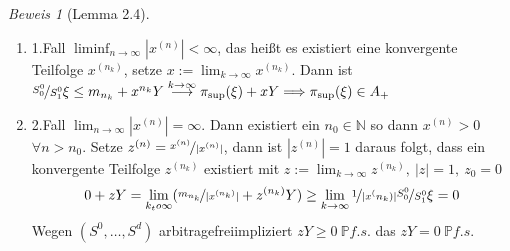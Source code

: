 \documentclass[]{scrartcl}
\numberwithin{equation}{section}
\theoremstyle{plain}
\theoremstyle{definition}
\theoremstyle{remark}
\theoremstyle{proof}
\newtheorem*{bew}{Beweis}
\newcommand{\N}{\mathbb{N}}
\renewcommand{\P}{\mathbb{P}}
\newcommand{\Ss}{\nicefrac{S_0^0}{S_1^0}}
\newcommand{\af}{arbitragefrei}
\begin{document}
\begin{bew}[Lemma 2.4]
\begin{enumerate}
 	 		\begin{enumerate}
 	 			\item 1.Fall $\operatorname{liminf}_{n\to\infty}|x^{(n)}|<\infty$, das heißt es existiert eine konvergente Teilfolge $x^{(n_k)}$, setze $x:=\lim_{k\to\infty}x^{(n_k)}$. Dann ist $\Ss\xi\le m_{n_k}+x^{n_k}Y\overset{k\to\infty}{\longrightarrow}\pi_{\sup}(\xi)+xY\Longrightarrow \pi_{\sup}(\xi)\in A_+$
 	 			\item 2.Fall $\lim_{n\to\infty}|x^{(n)}|=\infty$. Dann existiert ein $n_0\in\N$ so dann $x^{(n)}>0 $ $\forall n>n_0$. Setze $z^{(n)}=\nicefrac{x^{(n)}}{|x^{(n)}|}$, dann ist $|z^{(n)}|=1$ daraus folgt, dass ein konvergente Teilfolge $z^{(n_k)}$ existiert mit $z:=\lim_{k\to\infty}z^{(n_k)},\ |z|=1,\ z_0=0$
 	 			\begin{align*}
 	 				0+zY=\lim_{k_to\infty}(\nicefrac{m_{n_k}}{|x^{(n_k)}|}+z^{(n_k)}Y)\ge\lim_{k\to\infty}\nicefrac{1}{|x^(n_k)|}\Ss\xi=0
 	 			\end{align*}
 	 			Wegen $(S^0,…,S^d)$ \af impliziert $zY\ge 0\ \P f.s.$ das $zY=0\ \P f.s.$
 	 		\end{enumerate}
 	 		 	 	\end{enumerate}
 	 \end{bew}
\end{document}

